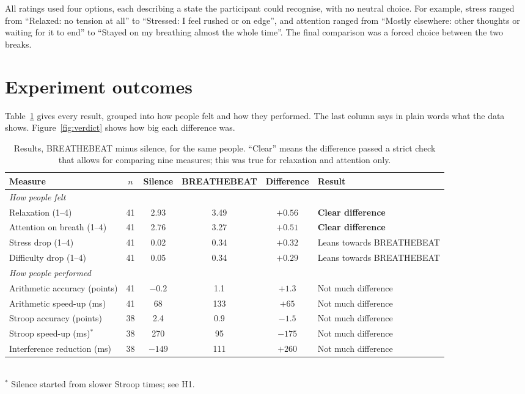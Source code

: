 \documentclass[11pt,a4paper]{article}
\begin{document}
All ratings used four options, each describing a state the participant could recognise, with no neutral choice. For example, stress ranged from ``Relaxed: no tension at all'' to ``Stressed: I feel rushed or on edge'', and attention ranged from ``Mostly elsewhere: other thoughts or waiting for it to end'' to ``Stayed on my breathing almost the whole time''. The final comparison was a forced choice between the two breaks.

\section{Experiment outcomes}

Table~\ref{tab:results} gives every result, grouped into how people felt and how they performed. The last column says in plain words what the data shows. Figure~\ref{fig:verdict} shows how big each difference was.

\begin{table}[!htbp]
\centering\small
\renewcommand{\arraystretch}{1.3}
\caption{Results, BREATHEBEAT minus silence, for the same people. ``Clear'' means the difference passed a strict check that allows for comparing nine measures; this was true for relaxation and attention only.}
\label{tab:results}
\begin{tabular}{l c c c c l}
\toprule
\textbf{Measure} & $n$ & \textbf{Silence} & \textbf{BREATHEBEAT} & \textbf{Difference} & \textbf{Result}\\
\midrule
\multicolumn{6}{l}{\emph{How people felt}}\\[2pt]
Relaxation (1--4) & 41 & 2.93 & 3.49 & $+0.56$ & \textbf{Clear difference}\\
Attention on breath (1--4) & 41 & 2.76 & 3.27 & $+0.51$ & \textbf{Clear difference}\\
Stress drop (1--4) & 41 & 0.02 & 0.34 & $+0.32$ & Leans towards BREATHEBEAT\\
Difficulty drop (1--4) & 41 & 0.05 & 0.34 & $+0.29$ & Leans towards BREATHEBEAT\\
\midrule
\multicolumn{6}{l}{\emph{How people performed}}\\[2pt]
Arithmetic accuracy (points) & 41 & $-0.2$ & 1.1 & $+1.3$ & Not much difference\\
Arithmetic speed-up (ms) & 41 & 68 & 133 & $+65$ & Not much difference\\
Stroop accuracy (points) & 38 & 2.4 & 0.9 & $-1.5$ & Not much difference\\
Stroop speed-up (ms)$^{*}$ & 38 & 270 & 95 & $-175$ & Not much difference\\
Interference reduction (ms) & 38 & $-149$ & 111 & $+260$ & Not much difference\\
\bottomrule
\end{tabular}
\\[4pt]
{\footnotesize $^{*}$ Silence started from slower Stroop times; see H1.}
\end{table}
\end{document}
